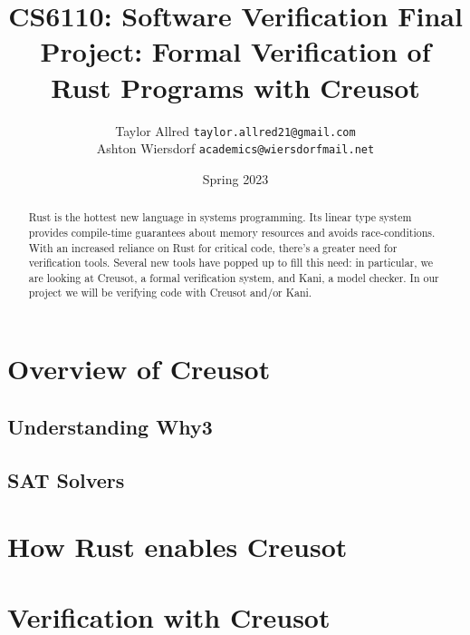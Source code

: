 \documentclass[12pt]{article}
\title{CS6110: Software Verification Final Project: Formal Verification of Rust Programs with Creusot}
\author{Taylor Allred \texttt{taylor.allred21@gmail.com}\\ Ashton Wiersdorf \texttt{academics@wiersdorfmail.net}}
\date{Spring 2023}
\begin{document}
\maketitle

\begin{abstract}
\noindent
Rust is the hottest new language in systems programming.
Its linear type system provides compile-time guarantees about memory resources and avoids race-conditions.
With an increased reliance on Rust for critical code, there's a greater need for verification tools.
Several new tools have popped up to fill this need: in particular, we are looking at Creusot, a formal verification system, and Kani, a model checker.
In our project we will be verifying code with Creusot and/or Kani.
\end{abstract}

\tableofcontents

\section{Overview of Creusot}


\subsection{Understanding Why3}


\subsection{SAT Solvers}


\section{How Rust enables Creusot}



\section{Verification with Creusot}
\end{document}
